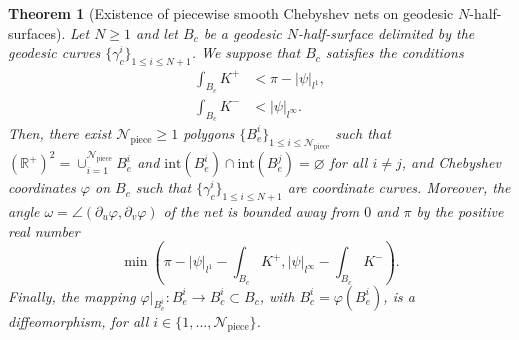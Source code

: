 \documentclass{article}
\newcommand{\R}{\mathbb{R}}
\newcommand{\DU}{\partial_{u}}
\newcommand{\DV}{\partial_{v}}
\newcommand{\halfP}{B}
\newcommand{\psim}{|\psi|_{l^\infty}}
\newcommand{\psitot}{|\psi|_{l^1}}
\newcommand{\Npiece}{\mathcal{N}_{\mathrm{piece}}}
\newtheorem{theorem}{Theorem}
\theoremstyle{remark}
\theoremstyle{prpart}
\begin{document}
\begin{theorem}[Existence of piecewise smooth Chebyshev nets on geodesic $N$-half-surfaces] \label{thm:cheb-half-surface-smooth3}
  Let $N\geq 1$ and let $\halfP_c$ be a geodesic $N$-half-surface delimited by the geodesic curves $\{\gamma_c^i\}_{1\leq i\leq N+1}$. We suppose that $\halfP_c$ satisfies the conditions   
\begin{align*} 
      \int_{\halfP_c} K^+ &< \pi-\psitot,\\
      \int_{\halfP_c} K^- &<  \psim.
\end{align*}
  Then, there exist $\Npiece\geq 1$ polygons $\{\halfP^i_e\}_{1\leq i\leq \Npiece}$ such that $(\R^+)^2 = \cup_{i=1}^{\Npiece}\halfP^i_e$ and $\text{int}(\halfP_e^i)\cap\text{int}(\halfP_e^j)=\varnothing$ for all $i\neq j$, and Chebyshev coordinates $\varphi$ on $\halfP_c$ such that $\{\gamma^i_c\}_{1\leq i\leq N+1}$ are coordinate curves. Moreover, the angle $\omega = \angle(\DU \varphi,\DV \varphi)$ of the net is bounded away from $0$ and $\pi$ by the positive real number
  \begin{equation*}
    \min\left(\pi-\psitot-\int_{\halfP_c} K^+,|\psi|_{l^\infty}-\int_{\halfP_c} K^-\right).
  \end{equation*}
  Finally, the mapping $\varphi\big|_{\halfP^i_e}:\halfP^i_e\to\halfP^i_c\subset\halfP_c$, with $\halfP^i_c = \varphi(\halfP^i_e)$, is a diffeomorphism, for all $i\in\{1,...,\Npiece\}$.
\end{theorem}


\end{document}
